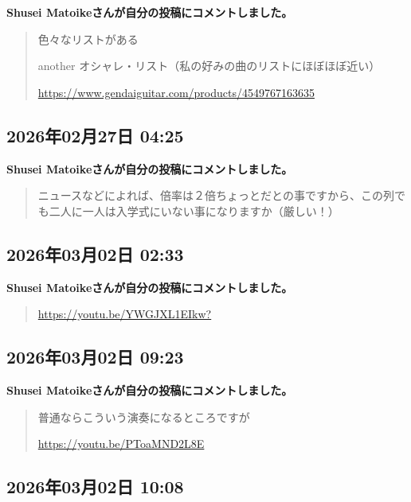\textbf{Shusei Matoikeさんが自分の投稿にコメントしました。}

\begin{quote}
色々なリストがある

another オシャレ・リスト（私の好みの曲のリストにほぼほぼ近い）

\url{https://www.gendaiguitar.com/products/4549767163635}
\end{quote}

\subsection*{2026年02月27日 04:25}

\textbf{Shusei Matoikeさんが自分の投稿にコメントしました。}

\begin{quote}
ニュースなどによれば、倍率は２倍ちょっとだとの事ですから、この列でも二人に一人は入学式にいない事になりますか（厳しい！）
\end{quote}

\subsection*{2026年03月02日 02:33}

\textbf{Shusei Matoikeさんが自分の投稿にコメントしました。}

\begin{quote}
\url{https://youtu.be/YWGJXL1EIkw?}
\end{quote}

\subsection*{2026年03月02日 09:23}

\textbf{Shusei Matoikeさんが自分の投稿にコメントしました。}

\begin{quote}
普通ならこういう演奏になるところですが

\url{https://youtu.be/PToaMND2L8E}
\end{quote}

\subsection*{2026年03月02日 10:08}

